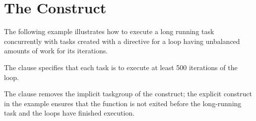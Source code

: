 \pagebreak
\chapter{The  Construct}
\label{chap:taskloop}

The following example illustrates how to execute a long running task concurrently with tasks created
with a  directive for a loop having unbalanced amounts of work for its iterations.

The  clause specifies that each task is to execute at least 500 iterations of the loop. 

The  clause removes the implicit taskgroup of the  construct; the explicit  construct in the example ensures that the function is not exited before the long-running task and the loops have finished execution.


